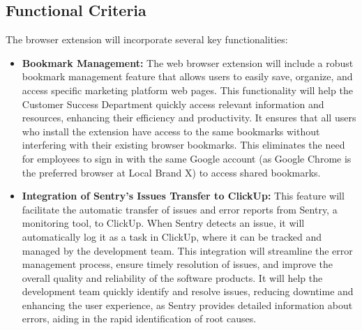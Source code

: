 \subsection{Functional Criteria}
The browser extension will incorporate several key functionalities:

\begin{itemize}
    \item \textbf{Bookmark Management:}
    The web browser extension will include a robust bookmark management feature that allows users to easily save, organize, and access specific marketing platform web pages. This functionality will help the Customer Success Department quickly access relevant information and resources, enhancing their efficiency and productivity. It ensures that all users who install the extension have access to the same bookmarks without interfering with their existing browser bookmarks. This eliminates the need for employees to sign in with the same Google account (as Google Chrome is the preferred browser at Local Brand X) to access shared bookmarks.


    \item \textbf{Integration of Sentry's Issues Transfer to ClickUp:}
    This feature will facilitate the automatic transfer of issues and error reports from Sentry, a monitoring tool, to ClickUp. When Sentry detects an issue, it will automatically log it as a task in ClickUp, where it can be tracked and managed by the development team. This integration will streamline the error management process, ensure timely resolution of issues, and improve the overall quality and reliability of the software products. It will help the development team quickly identify and resolve issues, reducing downtime and enhancing the user experience, as Sentry provides detailed information about errors, aiding in the rapid identification of root causes.
\end{itemize}

